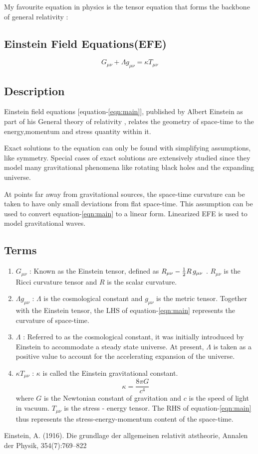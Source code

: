 My favourite equation in physics is the tensor equation that forms the backbone of general relativity :
\subsection{Einstein Field Equations(EFE)} 

\begin{equation}
{  G_{\mu \nu}  } + {  \Lambda g_{\mu \nu}  } = {\kappa T_{\mu \nu}}
\label{eqn:main}
\end{equation}

\subsection{Description}

Einstein field equations [equation-\ref{eqn:main}], published by Albert Einstein as part of his General theory of relativity \cite{Einstein}, relates the geometry of space-time to the energy,momentum and stress quantity within it. 

Exact solutions to the equation can only be found with simplifying assumptions, like symmetry. Special cases of exact solutions are extensively studied since they model many gravitational phenomena like rotating black holes and the expanding universe. 

At points far away from gravitational sources, the space-time curvature can be taken to have only small deviations from flat space-time. This assumption can be used to convert equation-\ref{eqn:main} to a linear form. Linearized EFE is used to model gravitational waves.

\subsection{Terms}

\begin{enumerate}
    \item $ G_{\mu \nu} $ : Known as the Einstein tensor, defined as $ R_{\mu \nu} - {1 \over 2}R \, g_{\mu \nu} $ . $ R_{\mu \nu} $ is the Ricci curvature tensor and $ R $ is the scalar curvature. 
    \item $ \Lambda g_{\mu \nu} $ : $ \Lambda $ is the cosmological  constant and $ g_{\mu \nu} $ is the metric tensor. Together with the Einstein tensor, the LHS of equation-\ref{eqn:main} represents the curvature of space-time.
    \item $ \Lambda $ : Referred to as the cosmological constant, it was initially introduced by Einstein to accommodate a steady state universe. At present, $ \Lambda $ is taken as a positive value to account for the accelerating expansion of the universe.
    \item $ \kappa T_{\mu \nu} $ : $ \kappa $ is called the Einstein gravitational constant. $$ \kappa = \frac{8 \pi G }{ c^4} \label{eqn:2}$$ where $ G $ is the Newtonian constant of gravitation and $ c $ is the speed of light in vacuum. $  T_{\mu \nu} $ is the stress - energy tensor. The RHS of equation-\ref{eqn:main} thus represents the stress-energy-momentum content of the space-time.
\end{enumerate}

\begin{thebibliography}{1}

 Einstein, A. (1916). Die      grundlage der allgemeinen relativit atstheorie, Annalen der Physik, 354(7):769–822

\end{thebibliography}

